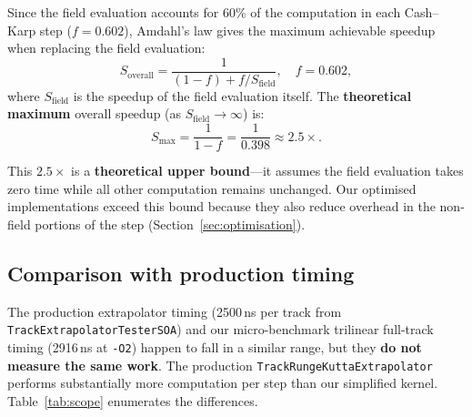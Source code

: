 \documentclass[11pt,a4paper]{article}
\begin{document}
Since the field evaluation accounts for 60\% of the computation in
each Cash--Karp step ($f = 0.602$), Amdahl's law gives the maximum
achievable speedup when replacing the field evaluation:
\begin{equation}
    S_{\text{overall}} = \frac{1}{(1 - f) + f / S_{\text{field}}},
    \quad f = 0.602,
    \label{eq:amdahl}
\end{equation}
where $S_{\text{field}}$ is the speedup of the field evaluation itself.
The \textbf{theoretical maximum} overall speedup (as
$S_{\text{field}} \to \infty$) is:
\begin{equation}
    S_{\max} = \frac{1}{1-f} = \frac{1}{0.398} \approx 2.5\times.
    \label{eq:amdahl_max}
\end{equation}

This $2.5\times$ is a \textbf{theoretical upper bound}---it assumes
the field evaluation takes zero time while all other computation remains
unchanged.  Our optimised implementations exceed this bound because
they also reduce overhead in the non-field portions of the step
(Section~\ref{sec:optimisation}).


\subsection{Comparison with production timing}
\label{sec:comparison}

The production extrapolator timing (2500\,ns per track from
\texttt{TrackExtrapolatorTesterSOA}) and our micro-benchmark
trilinear full-track timing (2916\,ns at \texttt{-O2}) happen to
fall in a similar range, but they \textbf{do not measure the same
work}.  The production \texttt{TrackRungeKuttaExtrapolator} performs
substantially more computation per step than our simplified kernel.
Table~\ref{tab:scope} enumerates the differences.
\end{document}
